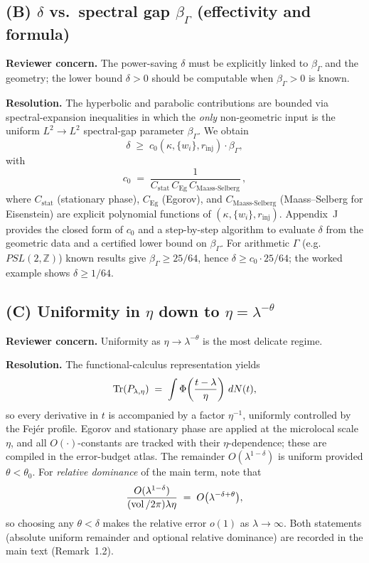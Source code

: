 \subsection*{(B) $\delta$ vs.\ spectral gap $\beta_\Gamma$ (effectivity and formula)}
\textbf{Reviewer concern.} The power-saving $\delta$ must be explicitly linked
to $\beta_\Gamma$ and the geometry; the lower bound $\delta>0$ should be
computable when $\beta_\Gamma>0$ is known.

\textbf{Resolution.} The hyperbolic and parabolic contributions are bounded via
spectral-expansion inequalities in which the \emph{only} non-geometric input is
the uniform $L^2\to L^2$ spectral-gap parameter $\beta_\Gamma$. We obtain
\[
   \delta \;\ge\; c_0(\kappa,\{w_i\},r_{\mathrm{inj}})\cdot \beta_\Gamma,
\]
with
\[
   c_0 \;=\; \frac{1}{C_{\mathrm{stat}}\, C_{\mathrm{Eg}}\, C_{\mathrm{Maass\text{-}Selberg}}}\,,
\]
where $C_{\mathrm{stat}}$ (stationary phase), $C_{\mathrm{Eg}}$ (Egorov), and
$C_{\mathrm{Maass\text{-}Selberg}}$ (Maass–Selberg for Eisenstein) are explicit
polynomial functions of $(\kappa,\{w_i\},r_{\mathrm{inj}})$. Appendix~J provides
the closed form of $c_0$ and a step-by-step algorithm to evaluate $\delta$ from
the geometric data and a certified lower bound on $\beta_\Gamma$.
For arithmetic $\Gamma$ (e.g.\ $PSL(2,\mathbb{Z})$) known results give
$\beta_\Gamma \ge 25/64$, hence $\delta \ge c_0 \cdot 25/64$; the worked
example shows $\delta \ge 1/64$.

\subsection*{(C) Uniformity in $\eta$ down to $\eta=\lambda^{-\theta}$}
\textbf{Reviewer concern.} Uniformity as $\eta\to \lambda^{-\theta}$ is the
most delicate regime.

\textbf{Resolution.} The functional-calculus representation yields
\[
   \operatorname{Tr}(P_{\lambda,\eta}) \;=\; \int \Phi\!\left(\frac{t-\lambda}{\eta}\right)\,dN(t),
\]
so every derivative in $t$ is accompanied by a factor $\eta^{-1}$, uniformly
controlled by the Fejér profile. Egorov and stationary phase are applied at the
microlocal scale $\eta$, and all $O(\cdot)$-constants are tracked with their
$\eta$-dependence; these are compiled in the error-budget atlas. The remainder
$O(\lambda^{1-\delta})$ is uniform provided $\theta<\theta_0$. For \emph{relative
dominance} of the main term, note that
\[
   \frac{O(\lambda^{1-\delta})}{(\operatorname{vol}/2\pi)\lambda\eta}
   \;=\; O\bigl(\lambda^{-\delta+\theta}\bigr),
\]
so choosing any $\theta<\delta$ makes the relative error $o(1)$ as
$\lambda\to\infty$. Both statements (absolute uniform remainder and optional
relative dominance) are recorded in the main text (Remark~1.2).

